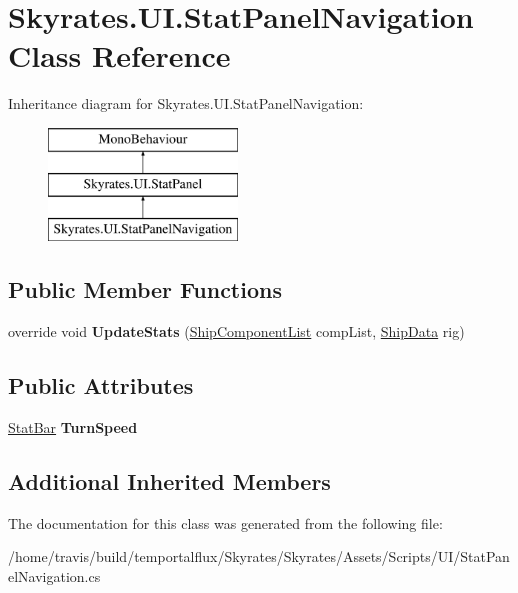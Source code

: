 \hypertarget{class_skyrates_1_1_u_i_1_1_stat_panel_navigation}{\section{Skyrates.\-U\-I.\-Stat\-Panel\-Navigation Class Reference}
\label{class_skyrates_1_1_u_i_1_1_stat_panel_navigation}
}
Inheritance diagram for Skyrates.\-U\-I.\-Stat\-Panel\-Navigation\-:\begin{figure}[H]
\begin{center}
\leavevmode
\includegraphics[height=3.000000cm]{class_skyrates_1_1_u_i_1_1_stat_panel_navigation}
\end{center}
\end{figure}
\subsection*{Public Member Functions}
\begin{DoxyCompactItemize}
\item 
\hypertarget{class_skyrates_1_1_u_i_1_1_stat_panel_navigation_a37cd19eccfef90e261ab13123a87af76}{override void {\bfseries Update\-Stats} (\hyperlink{class_skyrates_1_1_ship_1_1_ship_component_list}{Ship\-Component\-List} comp\-List, \hyperlink{class_skyrates_1_1_ship_1_1_ship_data}{Ship\-Data} rig)}\label{class_skyrates_1_1_u_i_1_1_stat_panel_navigation_a37cd19eccfef90e261ab13123a87af76}

\end{DoxyCompactItemize}
\subsection*{Public Attributes}
\begin{DoxyCompactItemize}
\item 
\hypertarget{class_skyrates_1_1_u_i_1_1_stat_panel_navigation_a54c7368d703349e5a20137006005d10c}{\hyperlink{class_skyrates_1_1_u_i_1_1_stat_bar}{Stat\-Bar} {\bfseries Turn\-Speed}}\label{class_skyrates_1_1_u_i_1_1_stat_panel_navigation_a54c7368d703349e5a20137006005d10c}

\end{DoxyCompactItemize}
\subsection*{Additional Inherited Members}


The documentation for this class was generated from the following file\-:\begin{DoxyCompactItemize}
\item 
/home/travis/build/temportalflux/\-Skyrates/\-Skyrates/\-Assets/\-Scripts/\-U\-I/Stat\-Panel\-Navigation.\-cs\end{DoxyCompactItemize}
